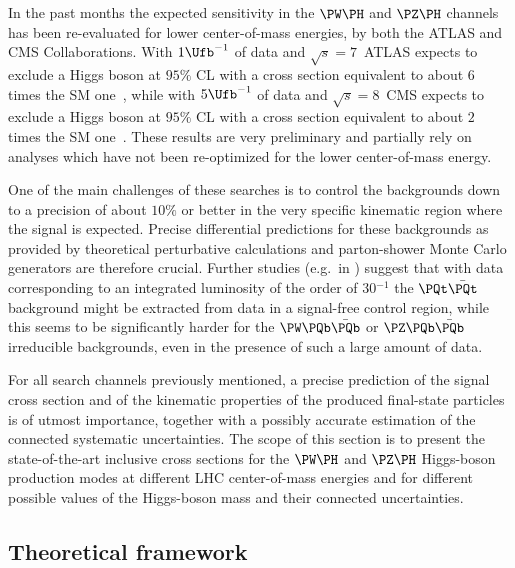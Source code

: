 In the past months the expected sensitivity in the $\PW\PH$ and $\PZ\PH$
channels has been re-evaluated for lower center-of-mass 
energies, by both the ATLAS and CMS Collaborations. With $1\Ufb^{-1}$ of data and 
$\sqrt{s}=7$\UTeV\ ATLAS expects to exclude a Higgs boson at $95\%$ CL 
with a cross section equivalent to about $6$ times the 
SM one~\cite{ATL-PHYS-PUB-2010-015}, 
while with $5\Ufb^{-1}$ of data and $\sqrt{s}=8$\UTeV\ CMS expects to exclude a 
Higgs boson at $95\%$ CL with a cross section equivalent to about
$2$ times the SM one~\cite{CMSPublicPhysicsResultsHIGStandardModelProjectionsWebPage}. 
These results are very preliminary and partially rely on analyses which have not been 
re-optimized for the lower center-of-mass energy.

One of the main challenges of these searches is to control the backgrounds down to
a precision of about $10\%$ or better in the very specific kinematic
region where the signal is expected. Precise differential predictions 
for these backgrounds as provided by theoretical perturbative calculations and parton-shower 
Monte Carlo generators are therefore crucial. Further studies (e.g.\ in
) suggest that with data corresponding to 
an integrated luminosity of the order of 30\Ufb$^{-1}$ the $\PQt\bar{\PQt}$
background might be extracted from data in a signal-free control region, 
while this seems to be significantly harder for the $\PW\PQb\bar{\PQb}$ or
$\PZ\PQb\bar{\PQb}$ irreducible backgrounds, even in the presence of such a 
large amount of data.

For all search channels previously mentioned, a precise prediction of the
signal cross section and of the kinematic properties of the produced
final-state particles is of utmost importance, together with a possibly
accurate estimation of the connected systematic uncertainties.  The
scope of this section is to present the state-of-the-art inclusive cross
sections for the $\PW\PH$ and $\PZ\PH$ Higgs-boson production modes at different
LHC center-of-mass energies and for different possible values of the
Higgs-boson mass and their connected uncertainties.

\subsection{Theoretical framework}

